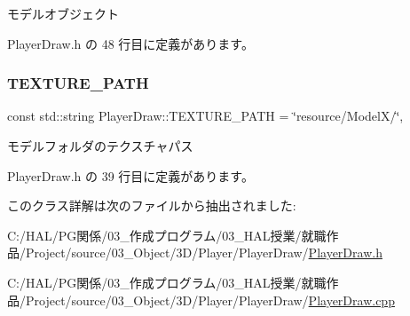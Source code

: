 モデルオブジェクト 



 Player\+Draw.\+h の 48 行目に定義があります。

\mbox{\label{class_player_draw_a808cb174528d55fb35a35b161e262e16}} 
\subsubsection{\texorpdfstring{T\+E\+X\+T\+U\+R\+E\+\_\+\+P\+A\+TH}{TEXTURE\_PATH}}
{\footnotesize\ttfamily const std\+::string Player\+Draw\+::\+T\+E\+X\+T\+U\+R\+E\+\_\+\+P\+A\+TH = \char`\"{}resource/ModelX/\char`\"{}\hspace{0.3cm}{\ttfamily [static]}, {\ttfamily [private]}}



モデルフォルダのテクスチャパス 



 Player\+Draw.\+h の 39 行目に定義があります。



このクラス詳解は次のファイルから抽出されました\+:\begin{DoxyCompactItemize}
\item 
C\+:/\+H\+A\+L/\+P\+G関係/03\+\_\+作成プログラム/03\+\_\+\+H\+A\+L授業/就職作品/\+Project/source/03\+\_\+\+Object/3\+D/\+Player/\+Player\+Draw/\mbox{\hyperlink{_player_draw_8h}{Player\+Draw.\+h}}\item 
C\+:/\+H\+A\+L/\+P\+G関係/03\+\_\+作成プログラム/03\+\_\+\+H\+A\+L授業/就職作品/\+Project/source/03\+\_\+\+Object/3\+D/\+Player/\+Player\+Draw/\mbox{\hyperlink{_player_draw_8cpp}{Player\+Draw.\+cpp}}\end{DoxyCompactItemize}
